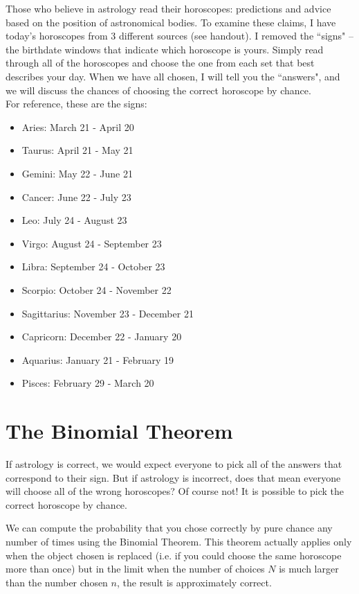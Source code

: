 \documentclass[12pt]{article}
\begin{document}
Those who believe in astrology read their horoscopes: predictions and advice based on the position of astronomical bodies. To examine these claims, I have today's horoscopes from 3 different sources (see handout). I removed the ``signs" -- the birthdate windows that indicate which horoscope is yours. Simply read through all of the horoscopes and choose the one from each set that best describes your day. When we have all chosen, I will tell you the ``answers", and we will discuss the chances of choosing the correct horoscope by chance. \\

\noindent For reference, these are the signs:
\begin{itemize}
\item Aries: March 21 - April 20
\item Taurus: April 21 - May 21
\item Gemini: May 22 - June 21
\item Cancer: June 22 - July 23
\item Leo: July 24 - August 23
\item Virgo: August 24 - September 23
\item Libra: September 24 - October 23
\item Scorpio: October 24 - November 22
\item Sagittarius: November 23  - December 21
\item Capricorn: December 22 - January 20
\item Aquarius: January 21 - February 19
\item Pisces: February 29 - March 20
\end{itemize}

\section*{The Binomial Theorem}
If astrology is correct, we would expect everyone to pick all of the answers that correspond to their sign. But if astrology is incorrect, does that mean everyone will choose all of the wrong horoscopes? Of course not! It is possible to pick the correct horoscope by chance. 

We can compute the probability that you chose correctly by pure chance any number of times using the Binomial Theorem. This theorem actually applies only when the object chosen is replaced (i.e. if you could choose the same horoscope more than once) but in the limit when the number of choices $N$ is much larger than the number chosen $n$, the result is approximately correct.
\end{document}
